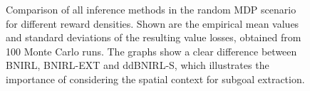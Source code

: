 \documentclass[twoside,11pt]{article}
\begin{document}
\begin{figure}[]
	\hfill
	\caption{Comparison of all inference methods in the random MDP scenario for different reward densities. Shown are the empirical mean values and standard deviations of the resulting value losses, obtained from 100 Monte Carlo runs. The graphs show a clear difference between BNIRL, BNIRL-EXT and ddBNIRL-S, which illustrates the importance of considering the spatial context for subgoal extraction.}
%
	\label{fig:randomWorldPolicyLoss}
\end{figure}
\end{document}
